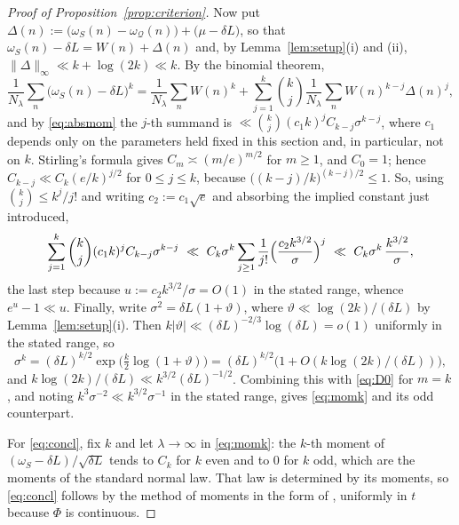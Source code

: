 \documentclass[11pt,a4paper]{article}
\theoremstyle{plain}
\theoremstyle{definition}
\numberwithin{equation}{section}
\begin{document}
\begin{proof}[Proof of Proposition~\ref{prop:criterion}]
Now put $\Delta(n):=\bigl(\omega_S(n)-\omega_{\mathcal Q}(n)\bigr)+\bigl(\mu-\delta L\bigr)$, so that
$\omega_S(n)-\delta L=W(n)+\Delta(n)$ and, by Lemma~\ref{lem:setup}(i) and (ii),
$\|\Delta\|_\infty\ll k+\log(2k)\ll k$. By the binomial theorem,
\[
\frac1{N_\lambda}\sum_{n}\bigl(\omega_S(n)-\delta L\bigr)^{k}
=\frac1{N_\lambda}\sum_{n}W(n)^{k}
+\sum_{j=1}^{k}\binom kj\frac1{N_\lambda}\sum_{n}W(n)^{k-j}\Delta(n)^{j},
\]
and by \eqref{eq:absmom} the $j$-th summand is $\ll\binom kj(c_1k)^{j}C_{k-j}\sigma^{k-j}$, where $c_1$
depends only on the parameters held fixed in this section and, in particular, not on $k$. Stirling's
formula gives $C_m\asymp(m/e)^{m/2}$ for $m\ge1$, and $C_0=1$; hence
$C_{k-j}\ll C_k(e/k)^{j/2}$ for $0\le j\le k$, because
$\bigl((k-j)/k\bigr)^{(k-j)/2}\le1$. So, using $\binom kj\le k^{j}/j!$ and writing
$c_2:=c_1\sqrt e$ and absorbing the implied constant just introduced,
\[
\sum_{j=1}^{k}\binom kj(c_1k)^{j}C_{k-j}\sigma^{k-j}
\ \ll\ C_k\sigma^{k}\sum_{j\ge1}\frac1{j!}\Bigl(\frac{c_2k^{3/2}}{\sigma}\Bigr)^{j}
\ \ll\ C_k\sigma^{k}\,\frac{k^{3/2}}{\sigma},
\]
the last step because $u:=c_2k^{3/2}/\sigma=O(1)$ in the stated range, whence
$e^{u}-1\ll u$. Finally, write
$\sigma^{2}=\delta L(1+\vartheta)$, where $\vartheta\ll\log(2k)/(\delta L)$ by
Lemma~\ref{lem:setup}(i). Then $k|\vartheta|\ll(\delta L)^{-2/3}\log(\delta L)=o(1)$ uniformly in
the stated range, so
\[
\sigma^{k}=(\delta L)^{k/2}\exp\bigl(\tfrac k2\log(1+\vartheta)\bigr)
=(\delta L)^{k/2}\bigl(1+O(k\log(2k)/(\delta L))\bigr),
\]
and $k\log(2k)/(\delta L)\ll k^{3/2}(\delta L)^{-1/2}$. Combining this with \eqref{eq:D0} for $m=k$,
and noting $k^{3}\sigma^{-2}\ll k^{3/2}\sigma^{-1}$ in the stated range, gives \eqref{eq:momk} and its odd
counterpart.

For \eqref{eq:concl}, fix $k$ and let $\lambda\to\infty$ in \eqref{eq:momk}: the $k$-th moment of
$(\omega_S-\delta L)/\sqrt{\delta L}$ tends to $C_k$ for $k$ even and to $0$ for $k$ odd, which
are the moments of the standard normal law. That law is determined by its moments, so \eqref{eq:concl}
follows by the method of moments in the form of \cite[Thm.~30.2]{Bil}, uniformly in $t$ because $\Phi$ is
continuous.


\end{proof}
\end{document}
